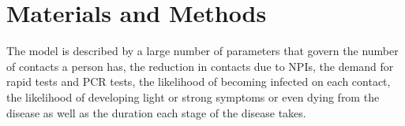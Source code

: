 \section{Materials and Methods}
\label{sec:materials_and_methods}

The model is described by a large number of parameters that govern the number of contacts
a person has, the reduction in contacts due to NPIs, the demand for rapid tests and PCR
tests, the likelihood of becoming infected on each contact, the likelihood of developing
light or strong symptoms or even dying from the disease as well as the duration each
stage of the disease takes.























